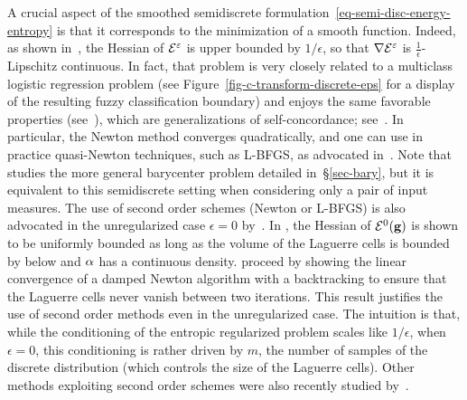 \begin{rem}\label{rem-second-order-smoothness}
	A crucial aspect of the smoothed semidiscrete formulation~\eqref{eq-semi-disc-energy-entropy} is that it corresponds to the minimization of a smooth function.
	Indeed, as shown in~\citep{genevay2016stochastic}, the Hessian of $\mathcal{E}^\varepsilon$ is upper bounded by $1/\epsilon$, so that $\nabla \mathcal{E}^\varepsilon$ is $\frac{1}{\epsilon}$-Lipschitz continuous.
	In fact, that problem is very closely related to a multiclass logistic regression problem (see Figure~\ref{fig-c-transform-discrete-eps} for a display of the resulting fuzzy classification boundary) and enjoys the same favorable properties (see~\citep{hosmer2013applied}), which are generalizations of self-concordance; see~\citep{bach2010self}. 
	In particular, the Newton method converges quadratically, and one can use in practice quasi-Newton techniques, such as L-BFGS, as advocated in~\citep{2016-Cuturi-siims}. Note that~\citep{2016-Cuturi-siims} studies the more general barycenter problem detailed in~\S\ref{sec-bary}, but it is equivalent to this semidiscrete setting when considering only a pair of input measures. 
	The use of second order schemes (Newton or L-BFGS) is also advocated in the unregularized case $\epsilon=0$ by~\citep{Merigot11,de2012blue,levy2015numerical}. In \citep[Theo. 5.1]{kitagawa2016newton}, the Hessian of $\mathcal{E}^0(\mathrm{\textbf{g}})$ is shown to be uniformly bounded as long as the volume of the Laguerre cells is bounded by below and $\alpha$ has a continuous density. \citeauthor{kitagawa2016newton} proceed by showing the linear convergence of a damped Newton algorithm with a backtracking to ensure that the Laguerre cells never vanish between two iterations. This result justifies the use of second order methods even in the unregularized case. The intuition is that, while the conditioning of the entropic regularized problem scales like $1/\epsilon$, when $\epsilon=0$, this conditioning is rather driven by $m$, the number of samples of the discrete distribution (which controls the size of the Laguerre cells).
	Other methods exploiting second order schemes were also recently studied by~\citep{knight2013fast,sugiyama2017tensor,cohen2017matrix,allen2017much}.
\end{rem}




